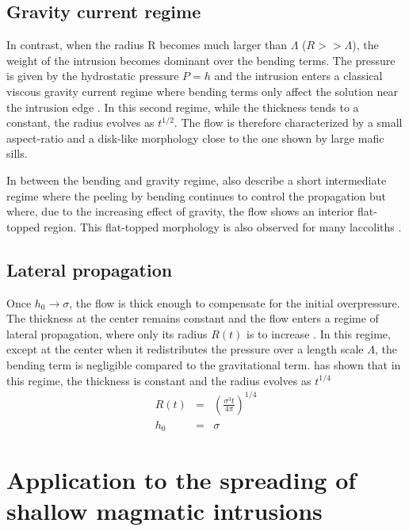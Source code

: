 \subsection{Gravity current regime}
\label{C2-sec:grav-curr-regime}

In  contrast, when  the radius  R becomes  much larger  than $\Lambda$
($R>>\Lambda$), the weight of the  intrusion becomes dominant over the
bending  terms.  The  pressure is  given by  the hydrostatic  pressure
$P = h$  and the intrusion enters a classical  viscous gravity current
regime where bending terms only affect the solution near the intrusion
edge   \citep{Huppert:1982a,Michaut:2011kg,Lister:2013ia}.   In   this
second regime,  while the  thickness tends to  a constant,  the radius
evolves as $t^{1/2}$.  The flow  is therefore characterized by a small
aspect-ratio  and a  disk-like morphology  close to  the one  shown by
large mafic sills.

In between the bending  and gravity regime, \citet{Lister:2013ia} also
describe  a short  intermediate regime  where the  peeling by  bending
continues to control the propagation  but where, due to the increasing
effect of gravity, the flow shows an interior flat-topped region. This
flat-topped   morphology  is   also  observed   for  many   laccoliths
\citep{Koch:1981if,Bunger:2011cb}.

\subsection{Lateral propagation}
\label{sec:lateral-propagation}

Once $h_0\rightarrow \sigma$,  the flow is thick  enough to compensate
for  the initial  overpressure. The  thickness at  the center  remains
constant and  the flow enters  a regime of lateral  propagation, where
only its radius $R(t)$ is  to increase \citep{Michaut:2011kg}. In this
regime, except at the center when it redistributes the pressure over a
length scale $\Lambda$, the bending term is negligible compared to the
gravitational  term. \citet{Michaut:2011kg}  has  shown  that in  this
regime, the thickness is constant and the radius evolves as $t^{1/4}$
\begin{eqnarray}
  R(t) &=& \left(\frac{\sigma^3 t}{4\pi}\right)^{1/4}\label{Scaling-R-Propa}\\
  h_0 &=& \sigma\label{Scaling-H-Propa}
\end{eqnarray} 

\section{Application to the spreading of shallow magmatic intrusions}
\label{C2-sec:appl-earth-moon}

